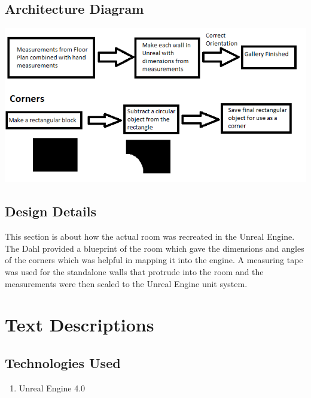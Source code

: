 
\subsection{ Architecture  Diagram}
\includegraphics[scale=1.0]{Diagrams/GalleryDiagram.png}





\subsection{Design Details}
This section is about how the actual room was recreated in the Unreal Engine.  The Dahl provided a blueprint of the room which gave the dimensions and angles of the corners which was helpful in mapping it into the engine.  A measuring tape was used for the standalone walls that protrude into the room and the measurements were then scaled to the Unreal Engine unit system.

\section{Text Descriptions}

\subsection{Technologies Used}
	\begin{enumerate}
		\item Unreal Engine 4.0
	\end{enumerate}

